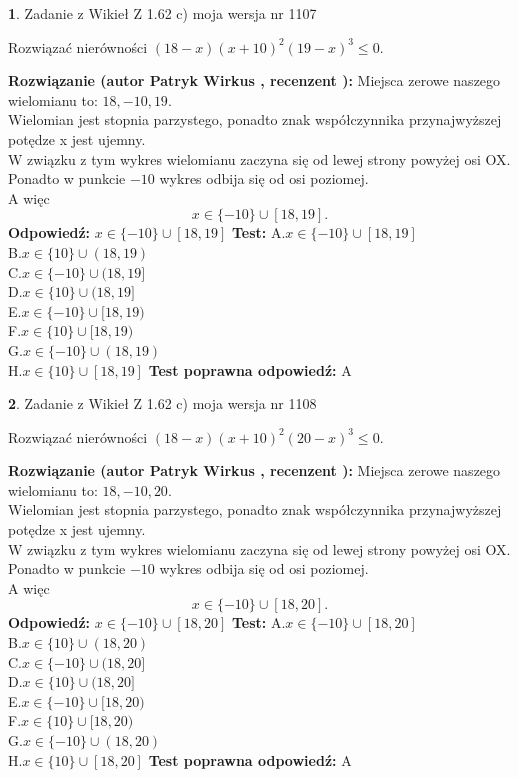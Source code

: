 \documentclass[12pt, a4paper]{article}
\theoremstyle{definition} %
\newtheorem{zad}{}
\newcommand{\zadStart}[1]{\begin{zad}#1\newline}
\newcommand{\zadStop}{\end{zad}}
\newcommand{\rozwStart}[2]{\noindent \textbf{Rozwiązanie (autor #1 , recenzent #2): }\newline}
\newcommand{\rozwStop}{\newline}
\newcommand{\odpStart}{\noindent \textbf{Odpowiedź:}\newline}
\newcommand{\odpStop}{\newline}
\newcommand{\testStart}{\noindent \textbf{Test:}\newline}
\newcommand{\testStop}{\newline}
\newcommand{\kluczStart}{\noindent \textbf{Test poprawna odpowiedź:}\newline}
\newcommand{\kluczStop}{\newline}
\begin{document}
\zadStart{Zadanie z Wikieł Z 1.62 c) moja wersja nr 1107}

Rozwiązać nierówności $(18-x)(x+10)^{2}(19-x)^{3}\le0$.
\zadStop
\rozwStart{Patryk Wirkus}{}
Miejsca zerowe naszego wielomianu to: $18, -10, 19$.\\
Wielomian jest stopnia parzystego, ponadto znak współczynnika przy\linebreak najwyższej potędze x jest ujemny.\\ W związku z tym wykres wielomianu zaczyna się od lewej strony powyżej osi OX.\\
Ponadto w punkcie $-10$ wykres odbija się od osi poziomej.\\
A więc $$x \in \{-10\} \cup [18,19].$$
\rozwStop
\odpStart
$x \in \{-10\} \cup [18,19]$
\odpStop
\testStart
A.$x \in \{-10\} \cup [18,19]$\\
B.$x \in \{10\} \cup (18,19)$\\
C.$x \in \{-10\} \cup (18,19]$\\
D.$x \in \{10\} \cup (18,19]$\\
E.$x \in \{-10\} \cup [18,19)$\\
F.$x \in \{10\} \cup [18,19)$\\
G.$x \in \{-10\} \cup (18,19)$\\
H.$x \in \{10\} \cup [18,19]$
\testStop
\kluczStart
A
\kluczStop



\zadStart{Zadanie z Wikieł Z 1.62 c) moja wersja nr 1108}

Rozwiązać nierówności $(18-x)(x+10)^{2}(20-x)^{3}\le0$.
\zadStop
\rozwStart{Patryk Wirkus}{}
Miejsca zerowe naszego wielomianu to: $18, -10, 20$.\\
Wielomian jest stopnia parzystego, ponadto znak współczynnika przy\linebreak najwyższej potędze x jest ujemny.\\ W związku z tym wykres wielomianu zaczyna się od lewej strony powyżej osi OX.\\
Ponadto w punkcie $-10$ wykres odbija się od osi poziomej.\\
A więc $$x \in \{-10\} \cup [18,20].$$
\rozwStop
\odpStart
$x \in \{-10\} \cup [18,20]$
\odpStop
\testStart
A.$x \in \{-10\} \cup [18,20]$\\
B.$x \in \{10\} \cup (18,20)$\\
C.$x \in \{-10\} \cup (18,20]$\\
D.$x \in \{10\} \cup (18,20]$\\
E.$x \in \{-10\} \cup [18,20)$\\
F.$x \in \{10\} \cup [18,20)$\\
G.$x \in \{-10\} \cup (18,20)$\\
H.$x \in \{10\} \cup [18,20]$
\testStop
\kluczStart
A
\kluczStop
\end{document}
